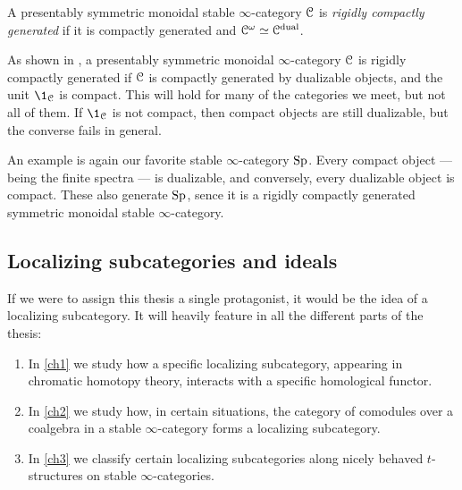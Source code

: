 \begin{definition}
    \label{ch0:rigidly-generated-category}
    A presentably symmetric monoidal stable $\infty$-category $\EuScript{C}$ is \emph{rigidly compactly generated} if it is compactly generated and $\EuScript{C}^\omega\simeq \EuScript{C}^{\mathrm{dual}}$. 
\end{definition}

\begin{remark}
    \label{ch0:rm:compacts-equal-dualizable}
    As shown in \cite[2.1.3]{hovey-palmiery-strickland_97}, a presentably symmetric monoidal $\infty$-category $\EuScript{C}$ is rigidly compactly generated if $\EuScript{C}$ is compactly generated by dualizable objects, and the unit $\1_\C$ is compact. This will hold for many of the categories we meet, but not all of them. If $\1_\C$ is not compact, then compact objects are still dualizable, but the converse fails in general. 
\end{remark}

An example is again our favorite stable $\infty$-category $\mathrm{Sp}$. Every compact object --- being the finite spectra --- is dualizable, and conversely, every dualizable object is compact. These also generate $\mathrm{Sp}$, sence it is a rigidly compactly generated symmetric monoidal stable $\infty$-category. 





\subsection{Localizing subcategories and ideals}
\label{ch0:ssec:localizing-subcategories-and-ideals}

If we were to assign this thesis a single protagonist, it would be the idea of a localizing subcategory. It will heavily feature in all the different parts of the thesis: 
\begin{enumerate}
    \item In \cref{ch1} we study how a specific localizing subcategory, appearing in chromatic homotopy theory, interacts with a specific homological functor.
    \item In \cref{ch2} we study how, in certain situations, the category of comodules over a coalgebra in a stable $\infty$-category forms a localizing subcategory. 
    \item In \cref{ch3} we classify certain localizing subcategories along nicely behaved $t$-structures on stable $\infty$-categories. 
\end{enumerate}

